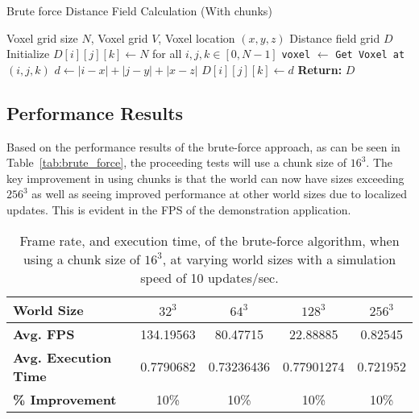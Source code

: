 \begin{algorithm}[H]
    \caption{Brute force Distance Field Calculation (With chunks)}
    \begin{algorithmic}[1]
        \REQUIRE Voxel grid size \(N\), Voxel grid \(V\), Voxel location \((x, y, z)\)
        \ENSURE Distance field grid \(D\)
        \STATE Initialize \(D[i][j][k] \gets N\) for all \(i, j, k \in [0, N-1]\)
        \STATE \texttt{voxel} $\gets$ \texttt{Get Voxel at} \((i, j, k)\)
        \STATE \(d \gets |i - x| + |j - y| + |x - z|\)
        \STATE \(D[i][j][k] \gets d\)
        \ENDIF
        \ENDIF
        \ENDFOR
        \ENDFOR
        \ENDFOR
        \STATE \textbf{Return:} \(D\)
    \end{algorithmic}
\end{algorithm}

\subsection{Performance Results}
Based on the performance results of the brute-force approach, as can be seen in Table~\ref{tab:brute_force}, the
proceeding tests will use a chunk size of \(16^3\). The key improvement in using chunks is that the world can now have
sizes exceeding \(256^3\) as well as seeing improved performance at other world sizes due to localized updates. This is
evident in the FPS of the demonstration application.

\begin{table}[h!]
    \centering
    \vspace{0.5em}
    \begin{tabular}{l|*{4}{c}}
        \toprule
        \textbf{World Size}          & \textbf{\(32^3\)} & \textbf{\(64^3\)} & \textbf{\(128^3\)} & \textbf{\(256^3\)} \\
        \midrule
        \textbf{Avg. FPS}            & 134.19563         & 80.47715          & 22.88885           & 0.82545            \\
        \textbf{Avg. Execution Time} & 0.7790682         & 0.73236436        & 0.77901274         & 0.721952           \\
        \textbf{\% Improvement}      & 10\%              & 10\%              & 10\%               & 10\%               \\
        \bottomrule
    \end{tabular}
    \caption{Frame rate, and execution time, of the brute-force algorithm, when using a chunk size of \(16^3\), at
        varying world sizes with a simulation speed of 10 updates/sec.}
\end{table}
